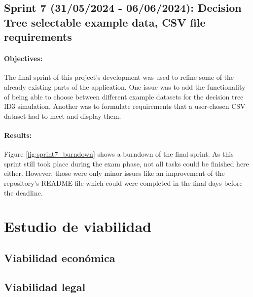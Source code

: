 \subsection{Sprint 7 (31/05/2024 - 06/06/2024): Decision Tree selectable example data, CSV file requirements}
\paragraph{Objectives:}
The final sprint of this project's development was used to refine some of the already existing parts of the application. One issue was to add the functionality of being able to choose between different example datasets for the decision tree ID3 simulation. Another was to formulate requirements that a user-chosen CSV dataset had to meet and display them.

\paragraph{Results:}
Figure \ref{fig:sprint7_burndown} shows a burndown of the final sprint. As this sprint still took place during the exam phase, not all tasks could be finished here either.  However, those were only minor issues like an improvement of the repository's README file which could were completed in the final days before the deadline.

\section{Estudio de viabilidad}

\subsection{Viabilidad económica}

\subsection{Viabilidad legal}